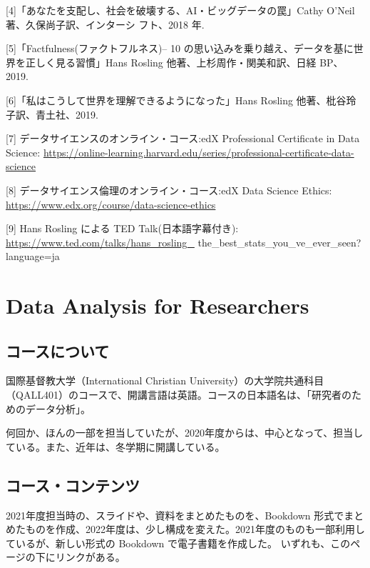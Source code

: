 \documentclass[
]{book}
\theoremstyle{definition}
\theoremstyle{definition}
\theoremstyle{definition}
\theoremstyle{definition}
\theoremstyle{remark}
\begin{document}
{[}4{]}「あなたを支配し、社会を破壊する、AI・ビッグデータの罠」Cathy O'Neil 著、久保尚子訳、インターシ
フト、2018 年.

{[}5{]}「Factfulness(ファクトフルネス)-- 10 の思い込みを乗り越え、データを基に世界を正しく見る習慣」Hans
Rosling 他著、上杉周作・関美和訳、日経 BP、2019.

{[}6{]}「私はこうして世界を理解できるようになった」Hans Rosling 他著、枇谷玲子訳、青土社、2019.

{[}7{]} データサイエンスのオンライン・コース:edX Professional Certificate in Data Science:
\url{https://online-learning.harvard.edu/series/professional-certificate-data-science}

{[}8{]} データサイエンス倫理のオンライン・コース:edX Data Science Ethics: \url{https://www.edx.org/course/data-science-ethics}

{[}9{]} Hans Rosling による TED Talk(日本語字幕付き): \url{https://www.ted.com/talks/hans_rosling_} the\_best\_stats\_you\_ve\_ever\_seen?language=ja

\hypertarget{da4r}{%
\chapter{Data Analysis for Researchers}\label{da4r}}

\hypertarget{ux30b3ux30fcux30b9ux306bux3064ux3044ux3066}{%
\section{コースについて}\label{ux30b3ux30fcux30b9ux306bux3064ux3044ux3066}}

国際基督教大学（International Christian University）の大学院共通科目（QALL401）のコースで、開講言語は英語。コースの日本語名は、「研究者のためのデータ分析」。

何回か、ほんの一部を担当していたが、2020年度からは、中心となって、担当している。また、近年は、冬学期に開講している。

\hypertarget{ux30b3ux30fcux30b9ux30b3ux30f3ux30c6ux30f3ux30c4}{%
\section{コース・コンテンツ}\label{ux30b3ux30fcux30b9ux30b3ux30f3ux30c6ux30f3ux30c4}}

2021年度担当時の、スライドや、資料をまとめたものを、Bookdown 形式でまとめたものを作成、2022年度は、少し構成を変えた。2021年度のものも一部利用しているが、新しい形式の Bookdown で電子書籍を作成した。
いずれも、このページの下にリンクがある。
\end{document}
